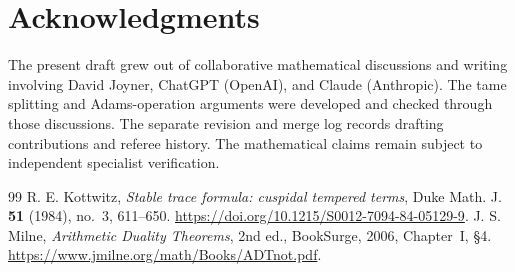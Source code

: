 \documentclass[11pt]{article}
\theoremstyle{plain}
\theoremstyle{definition}
\begin{document}
\section*{Acknowledgments}
The present draft grew out of collaborative mathematical discussions and
writing involving David Joyner, ChatGPT (OpenAI), and Claude (Anthropic).
The tame splitting and Adams-operation arguments were developed and
checked through those discussions. The separate revision and merge log
records drafting contributions and referee history. The mathematical
claims remain subject to independent specialist verification.

\begin{thebibliography}{99}
 R. E. Kottwitz, \emph{Stable trace formula: cuspidal tempered terms},
Duke Math. J. \textbf{51} (1984), no.~3, 611--650.
\url{https://doi.org/10.1215/S0012-7094-84-05129-9}.
 J. S. Milne, \emph{Arithmetic Duality Theorems}, 2nd ed.,
BookSurge, 2006, Chapter~I, \S4.
\url{https://www.jmilne.org/math/Books/ADTnot.pdf}.


\end{thebibliography}
\end{document}
